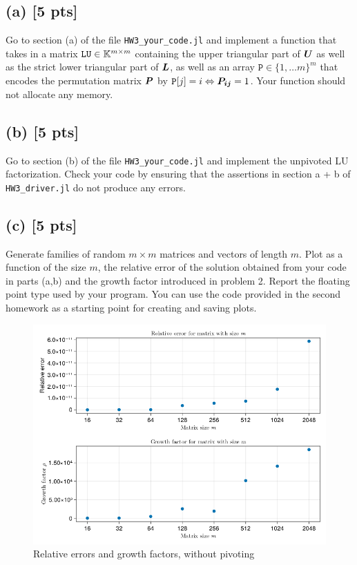 \documentclass[twoside,10pt]{article}
\begin{document}
\subsection*{(a) [5 pts]} 
Go to section (a) of the file \texttt{HW3\_your\_code.jl} and implement a function that takes in a matrix $\mathtt{LU} \in \mathbb{K}^{m \times m}$ containing the upper triangular part of $\bm{U}$ as well as the strict lower triangular part of $\bm{L}$, as well as an array $\mathtt{P} \in \{1, \ldots m\}^{m}$ that encodes the permutation matrix $\bm{P}$ by $\mathtt{P}[j] = i \Leftrightarrow \bm{P_{ij}} = 1$.
Your function should not allocate any memory. 


\subsection*{(b) [5 pts]} 
Go to section (b) of the file \texttt{HW3\_your\_code.jl} and implement the unpivoted LU factorization. 
Check your code by ensuring that the assertions in section a + b of \texttt{HW3\_driver.jl} do not produce any errors.

\subsection*{(c) [5 pts]}
Generate families of random $m \times m$ matrices and vectors of length $m$. 
Plot as a function of the size $m$, the relative error of the solution obtained from your code in parts (a,b) and the growth factor introduced in problem 2.
Report the floating point type used by your program.
You can use the code provided in the second homework as a starting point for creating and saving plots.

\begin{figure}[htb]
  \begin{center}
  \includegraphics[width=120mm]{HW3_code/rel_error_and_growth_no_pivot.png}
  \end{center}
  \caption{Relative errors and growth factors, without pivoting}
  \label{fig:figure1}
\end{figure}
\end{document}
